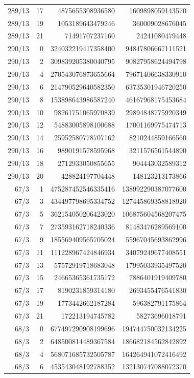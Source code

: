 \begin{longtable}{@{}rrrr@{}}
289/13 & 17 & 4875655308936580 & 1609898059143570\\
289/13 & 19 & 1053189643479246 & 360009028676045\\
289/13 & 21 & 71491707237160 & 24241080479448\\
290/13 & 0 & 324032219417358400 & 94847806667111521\\
290/13 & 2 & 309839205380040795 & 90827958624494798\\
290/13 & 4 & 270543076873655664 & 79671406638330910\\
290/13 & 6 & 214790529640582350 & 63735301946720250\\
290/13 & 8 & 153898643986587240 & 46167968175453684\\
290/13 & 10 & 98261751065970839 & 29894848775920349\\
290/13 & 12 & 54883005898100688 & 17001169975474713\\
290/13 & 14 & 25952580778707162 & 8210244859166560\\
290/13 & 16 & 9890191578595968 & 3211576561544890\\
290/13 & 18 & 2712933050855655 & 904443032589312\\
290/13 & 20 & 428824197704448 & 148123213173866\\
67/3 & 1 & 475287452546335416 & 138992290387077600\\
67/3 & 3 & 434497798695334752 & 127445869358818920\\
67/3 & 5 & 362154050206423020 & 106875604568207475\\
67/3 & 7 & 273593162718240336 & 81483476289569100\\
67/3 & 9 & 185569409565705024 & 55967045693862996\\
67/3 & 11 & 111228967424846934 & 34079249677408551\\
67/3 & 13 & 57572919718683048 & 17995033935497520\\
67/3 & 15 & 24665365361735172 & 7886401919409780\\
67/3 & 17 & 8190231859314180 & 2693455476541830\\
67/3 & 19 & 1773442662187284 & 596382791175864\\
67/3 & 21 & 172213194745782 & 58273696018791\\
68/3 & 0 & 677497290908199696 & 194744750032134225\\
68/3 & 2 & 648500814489367584 & 186682184562842892\\
68/3 & 4 & 568071685732505787 & 164264941072416492\\
68/3 & 6 & 453543048192788352 & 132130747088072370\\

\end{longtable}
